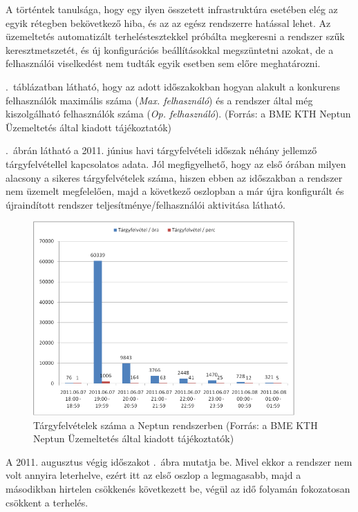 A történtek tanulsága, hogy egy ilyen összetett infrastruktúra esetében elég az egyik rétegben bekövetkező hiba, és az az egész rendszerre hatással lehet. Az üzemeltetés automatizált terheléstesztekkel próbálta megkeresni a rendszer szűk keresztmetszetét, és új konfigurációs beállításokkal megszüntetni azokat, de a felhasználói viselkedést nem tudták egyik esetben sem előre meghatározni.

.~táblázatban látható, hogy az adott időszakokban hogyan alakult a konkurens felhasználók maximális száma (\textit{Max. felhasználó}) és a rendszer által még kiszolgálható felhasználók száma (\textit{Op. felhasználó}). (Forrás: a BME KTH Neptun Üzemeltetés által kiadott tájékoztatók)



.~ábrán látható a 2011. június havi tárgyfelvételi időszak néhány jellemző tárgyfelvétellel kapcsolatos adata. Jól megfigyelhető, hogy az első órában milyen alacsony a sikeres tárgyfelvételek száma, hiszen ebben az időszakban a rendszer nem üzemelt megfelelően, majd a következő oszlopban a már újra konfigurált és újraindított rendszer teljesítménye/felhasználói aktivitása látható.

\begin{figure}[!ht]
\centering
\includegraphics[width=100mm, keepaspectratio]{figures/neptun_003.png}
\caption{Tárgyfelvételek száma a Neptun rendszerben (Forrás: a BME KTH Neptun Üzemeltetés által kiadott tájékoztatók)}
\label{fig:neptun_003}
\end{figure}

A 2011. augusztus végig időszakot .~ábra mutatja be. Mivel ekkor a rendszer nem volt annyira leterhelve, ezért itt az első oszlop a legmagasabb, majd a másodikban hirtelen csökkenés következett be, végül az idő folyamán fokozatosan csökkent a terhelés.

